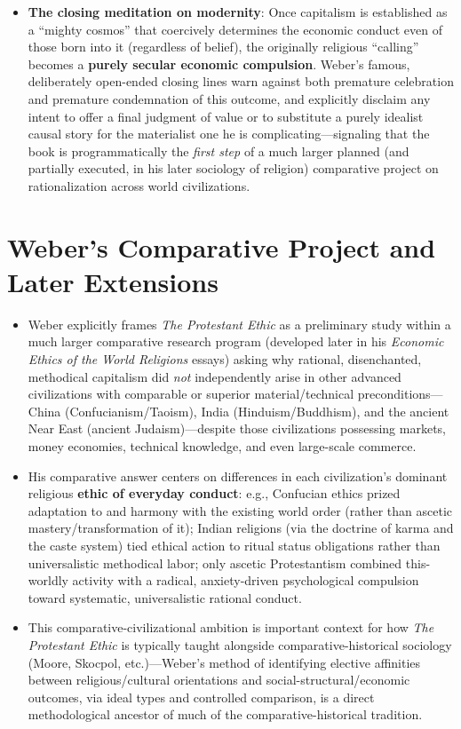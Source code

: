\documentclass[12pt]{article}
\begin{document}
\begin{itemize}[leftmargin=*, itemsep=4pt]
    \item \textbf{The closing meditation on modernity}: Once capitalism is established as a ``mighty cosmos'' that coercively determines the economic conduct even of those born into it (regardless of belief), the originally religious ``calling'' becomes a \textbf{purely secular economic compulsion}. Weber's famous, deliberately open-ended closing lines warn against both premature celebration and premature condemnation of this outcome, and explicitly disclaim any intent to offer a final judgment of value or to substitute a purely idealist causal story for the materialist one he is complicating---signaling that the book is programmatically the \emph{first step} of a much larger planned (and partially executed, in his later sociology of religion) comparative project on rationalization across world civilizations.
\end{itemize}

\section{Weber's Comparative Project and Later Extensions}

\begin{itemize}[leftmargin=*, itemsep=4pt]
    \item Weber explicitly frames \textit{The Protestant Ethic} as a preliminary study within a much larger comparative research program (developed later in his \textit{Economic Ethics of the World Religions} essays) asking why rational, disenchanted, methodical capitalism did \emph{not} independently arise in other advanced civilizations with comparable or superior material/technical preconditions---China (Confucianism/Taoism), India (Hinduism/Buddhism), and the ancient Near East (ancient Judaism)---despite those civilizations possessing markets, money economies, technical knowledge, and even large-scale commerce.
    \item His comparative answer centers on differences in each civilization's dominant religious \textbf{ethic of everyday conduct}: e.g., Confucian ethics prized adaptation to and harmony with the existing world order (rather than ascetic mastery/transformation of it); Indian religions (via the doctrine of karma and the caste system) tied ethical action to ritual status obligations rather than universalistic methodical labor; only ascetic Protestantism combined this-worldly activity with a radical, anxiety-driven psychological compulsion toward systematic, universalistic rational conduct.
    \item This comparative-civilizational ambition is important context for how \textit{The Protestant Ethic} is typically taught alongside comparative-historical sociology (Moore, Skocpol, etc.)---Weber's method of identifying elective affinities between religious/cultural orientations and social-structural/economic outcomes, via ideal types and controlled comparison, is a direct methodological ancestor of much of the comparative-historical tradition.
\end{itemize}
\end{document}

